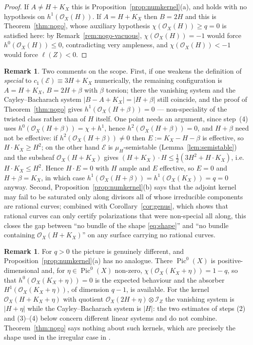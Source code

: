 \documentclass{amsart}
\theoremstyle{definition}
\newtheorem{remark}[theorem]{Remark}
\newcommand{\OO}{\mathcal{O}}
\newcommand{\EE}{\mathcal{E}}
\newcommand{\II}{\mathcal{I}}
\newcommand{\Pic}{\operatorname{Pic}}
\newcommand{\len}{\ell}
\begin{document}
\begin{proof}
If $A\neq H+K_X$ this is Proposition~\ref{prop:numkernel}(a), and holds with no hypothesis on $h^1(\OO_X(H))$. If $A=H+K_X$ then $B=2H$ and this is Theorem~\ref{thm:nogo}, whose auxiliary hypothesis $\chi(\OO_X(H))\ge q=0$ is satisfied here: by Remark~\ref{rem:nogo-vacuous}, $\chi(\OO_X(H))=-1$ would force $h^0(\OO_X(H))\le0$, contradicting very ampleness, and $\chi(\OO_X(H))<-1$ would force $\len(Z)<0$.
\end{proof}

\begin{remark}\label{rem:numerical-scope}
Two comments on the scope. First, if one weakens the definition of \emph{special} to $c_1(\EE)\equiv3H+K_X$ numerically, the remaining configuration is $A=H+K_X$, $B=2H+\beta$ with $\beta$ torsion; there the vanishing system and the Cayley--Bacharach system $|B-A+K_X|=|H+\beta|$ still coincide, and the proof of Theorem~\ref{thm:nogo} gives $h^1(\OO_X(H+\beta))=0$ --- non-speciality of the twisted class rather than of $H$ itself. One point needs an argument, since step~(4) uses $h^0(\OO_X(H+\beta))=\chi+h^1$, hence $h^2(\OO_X(H+\beta))=0$, and $H+\beta$ need not be effective: if $h^2(\OO_X(H+\beta))\neq0$ then $E:=K_X-H-\beta$ is effective, so $H\cdot K_X\ge H^2$; on the other hand $\EE$ is $\mu_H$-semistable (Lemma~\ref{lem:semistable}) and the subsheaf $\OO_X(H+K_X)$ gives $(H+K_X)\cdot H\le\tfrac12(3H^2+H\cdot K_X)$, i.e.\ $H\cdot K_X\le H^2$. Hence $H\cdot E=0$ with $H$ ample and $E$ effective, so $E=0$ and $H+\beta=K_X$, in which case $h^1(\OO_X(H+\beta))=h^1(\OO_X(K_X))=q=0$ anyway. Second, Proposition~\ref{prop:numkernel}(b) says that the adjoint kernel may fail to be saturated only along divisors all of whose irreducible components are rational curves; combined with Corollary~\ref{cor:genus}, which shows that rational curves can only certify polarizations that were non-special all along, this closes the gap between ``no bundle of the shape \eqref{eq:shape}'' and ``no bundle containing $\OO_X(H+K_X)$'' on any surface carrying no rational curves.
\end{remark}

\begin{remark}\label{rem:twisted-irregular}
For $q>0$ the picture is genuinely different, and Proposition~\ref{prop:numkernel}(a) has no analogue. There $\Pic^0(X)$ is positive-dimensional and, for $\eta\in\Pic^0(X)$ non-zero, $\chi(\OO_X(K_X+\eta))=1-q$, so that $h^0(\OO_X(K_X+\eta))=0$ is the expected behaviour and the absorber $H^1(\OO_X(K_X+\eta))$, of dimension $q-1$, is available. For the kernel $\OO_X(H+K_X+\eta)$ with quotient $\OO_X(2H+\eta)\otimes\II_Z$ the vanishing system is $|H+\eta|$ while the Cayley--Bacharach system is $|H|$: the two estimates of steps (2) and (3)--(4) below concern different linear systems and do not combine. Theorem~\ref{thm:nogo} says nothing about such kernels, which are precisely the shape used in the irregular case in \cite{Cas19}.
\end{remark}
\end{document}
